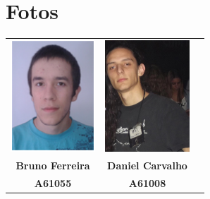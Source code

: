 \documentclass[a5paper,twocolumn, 11pt]{article}
\begin{document}
\clearpage
\onecolumn
\section{Fotos}
\begin{center}
    \begin{tabular}{ccc}
        \includegraphics[width=90pt]{bruno.png}&
        \includegraphics[width=90pt]{daniel.png}\\
        
        \small{\textbf{Bruno Ferreira}}&
        \small{\textbf{Daniel Carvalho}}\\
        \small{\textbf{A61055}}&
        \small{\textbf{A61008}}\\
    \end{tabular}
\end{center}
\end{document}
